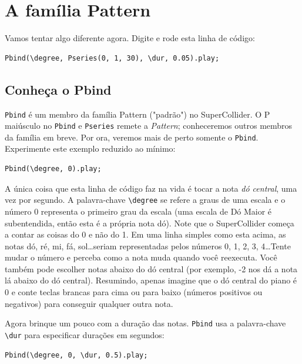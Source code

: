 \section{A família Pattern}

Vamos tentar algo diferente agora. Digite e rode esta linha de código:

\begin{lstlisting}[style=SuperCollider-IDE, basicstyle=\scttfamily\footnotesize]
Pbind(\degree, Pseries(0, 1, 30), \dur, 0.05).play;
\end{lstlisting}

\subsection{Conheça o Pbind}

\texttt{Pbind} é um membro da família Pattern ("padrão") no SuperCollider. O P maiúsculo no \texttt{Pbind} e \texttt{Pseries} remete a \emph{Pattern}; conheceremos outros membros da família em breve. Por ora, veremos mais de perto somente o \texttt{Pbind}. Experimente este exemplo reduzido ao mínimo:

\begin{lstlisting}[style=SuperCollider-IDE, basicstyle=\scttfamily\footnotesize]
Pbind(\degree, 0).play;
\end{lstlisting}

A única coisa que esta linha de código faz na vida é tocar a nota \emph{dó central}, uma vez por segundo. A palavra-chave \texttt{\textbackslash degree} se refere a graus de uma escala e o número 0 representa o primeiro grau da escala (uma escala de Dó Maior é subentendida, então esta é a própria nota dó). Note que o SuperCollider começa a contar as coisas do 0 e não do 1. Em uma linha simples como esta acima, as notas dó, ré, mi, fá, sol\dots seriam representadas pelos números 0, 1, 2, 3, 4\dots Tente mudar o número e perceba como a nota muda quando você reexecuta. Você também pode escolher notas abaixo do dó central (por exemplo, -2 nos dá a nota lá abaixo do dó central). Resumindo, apenas imagine que o dó central do piano é 0 e conte teclas brancas para cima ou para baixo (números positivos ou negativos) para conseguir qualquer outra nota.

Agora brinque um pouco com a duração das notas. \texttt{Pbind} usa a palavra-chave \texttt{\textbackslash dur} para especificar durações em segundos:

\begin{lstlisting}[style=SuperCollider-IDE, basicstyle=\scttfamily\footnotesize]
Pbind(\degree, 0, \dur, 0.5).play;
\end{lstlisting}

